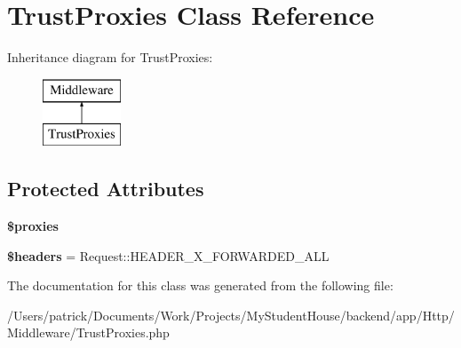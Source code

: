 \hypertarget{class_app_1_1_http_1_1_middleware_1_1_trust_proxies}{}\section{Trust\+Proxies Class Reference}
\label{class_app_1_1_http_1_1_middleware_1_1_trust_proxies}
Inheritance diagram for Trust\+Proxies\+:\begin{figure}[H]
\begin{center}
\leavevmode
\includegraphics[height=2.000000cm]{class_app_1_1_http_1_1_middleware_1_1_trust_proxies}
\end{center}
\end{figure}
\subsection*{Protected Attributes}
\begin{DoxyCompactItemize}
\item 
\mbox{\label{class_app_1_1_http_1_1_middleware_1_1_trust_proxies_a9fed7e7c82160e6b32d7ed4c8193c195}} 
{\bfseries \$proxies}
\item 
\mbox{\label{class_app_1_1_http_1_1_middleware_1_1_trust_proxies_a52500036ee807241b8b4b7e2367c49ef}} 
{\bfseries \$headers} = Request\+::\+H\+E\+A\+D\+E\+R\+\_\+\+X\+\_\+\+F\+O\+R\+W\+A\+R\+D\+E\+D\+\_\+\+A\+LL
\end{DoxyCompactItemize}


The documentation for this class was generated from the following file\+:\begin{DoxyCompactItemize}
\item 
/\+Users/patrick/\+Documents/\+Work/\+Projects/\+My\+Student\+House/backend/app/\+Http/\+Middleware/Trust\+Proxies.\+php\end{DoxyCompactItemize}
